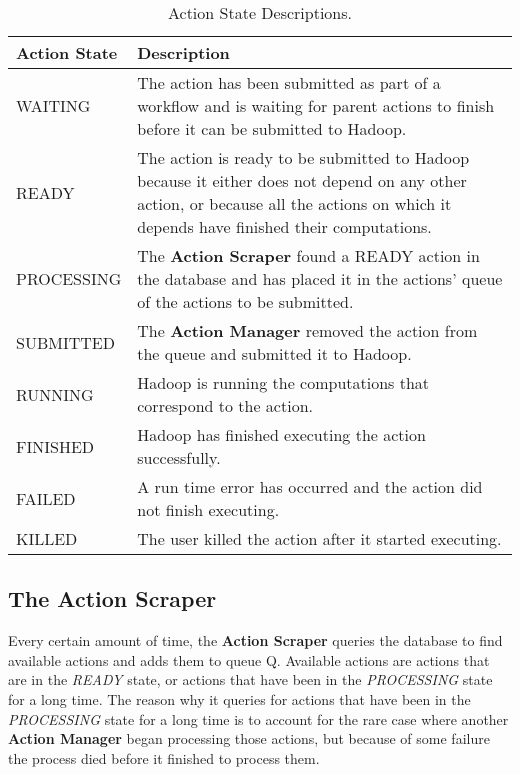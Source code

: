 \begin{table}
\begin{tabular}{| l | p{12cm} |}

\hline
\textbf{Action State} & \textbf{Description} \\ \hline
WAITING & The action has been submitted as part of a workflow and is waiting for parent actions to finish before it can be submitted to Hadoop.\\ \hline
READY & The action is ready to be submitted to Hadoop because it either does not depend on any other action, or because all the actions on which it depends have finished their computations. \\ \hline
PROCESSING & The \textbf{Action Scraper} found a READY action in the database and has placed it in the actions' queue of the actions to be submitted. \\ \hline
SUBMITTED & The \textbf{Action Manager} removed the action from the queue and submitted it to Hadoop. \\ \hline
RUNNING & Hadoop is running the computations that correspond to the action. \\ \hline
FINISHED & Hadoop has finished executing the action successfully.\\ \hline
FAILED & A run time error has occurred and the action did not finish executing.\\ \hline
KILLED & The user killed the action after it started executing.\\ \hline
\end{tabular}
\caption{Action State Descriptions.\label{tab:action_states}}
\end{table}

\subsection{The Action Scraper}
Every certain amount of time, the \textbf{Action Scraper} queries the database to find available actions and adds them to queue Q. Available actions are actions that are in the \textit{READY} state, or actions that have been in the \textit{PROCESSING} state for a long time. The reason why it queries for actions that have been in the \textit{PROCESSING} state for a long time is to account for the rare case where another \textbf{Action Manager} began processing those actions, but because of some failure the process died before it finished to process them.

